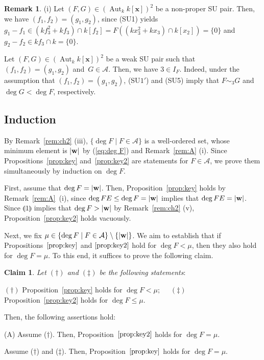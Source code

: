 \documentclass{amsart}
\theoremstyle{plain}
\theoremstyle{definition}
\newtheorem{rem}[thm]{Remark}
\newtheorem*{klaim}{Claim}
\newcommand{\A}{\mathcal{A}}
\newcommand{\zs}{\{ 0\} }
\newcommand{\sm}{\setminus}
\newcommand{\Aut }{\mathop{\mathrm{Aut}}\nolimits}
\newcommand{\nd}{\noindent}
\newcommand{\x}{{\boldsymbol x}}
\newcommand{\w}{{\bf w}}
\newcommand{\kx}{k[\x]}
\begin{document}
\begin{rem}\label{exc:used for Claim B}\rm
(i) Let $(F,G)\in (\Aut _k\kx )^2$ be a non-proper SU pair. 
Then, we have $(f_1,f_2)=(g_1,g_2)$, 
since (SU1) yields 
$g_1-f_1\in 
(kf_3^2+kf_3)\cap k[f_2]
=F((kx_3^2+kx_3)\cap k[x_2])=\zs $ 
and $g_2-f_2\in kf_3\cap k=\zs $. 



\nd{\rm (ii)} 
Let $(F,G)\in (\Aut _k\kx )^2$ be a weak SU pair 
such that $(f_1,f_2)=(g_1,g_2)$ and~$G\in \A $. 
Then, we have $3\in I_F$. 
Indeed, 
under the assumption that $(f_1,f_2)=(g_1,g_2)$, 
(SU$1'$) and (SU5) imply that $F\sim _3G$ and $\deg G<\deg F$, 
respectively. 
\end{rem}



\subsection{Induction}
By Remark~\ref{rem:ch2} (iii), 
$\{ \deg F\mid F\in \mathcal{A}\} $ 
is a well-ordered set, 
whose minimum element is $|\w |$ by 
(\ref{eq:deg F}) and Remark~\ref{rem:A} (i). 
Since Propositions~\ref{prop:key} and~\ref{prop:key2} 
are statements for $F\in \A $, 
we prove them simultaneously by induction on $\deg F$. 


First, assume that $\deg F=|\w |$. 
Then, Proposition~\ref{prop:key} holds by Remark~\ref{rem:A}~(i), 
since $\deg FE\le \deg F=|\w |$ 
implies that $\deg FE=|\w |$. 
Since $\llparenthesis 1 \rrparenthesis$ 
implies that $\deg F>|\w |$ 
by Remark~\ref{rem:ch2} (v), 
Proposition~\ref{prop:key2} holds vacuously. 


Next, we fix $\mu \in \{ \deg F\mid F\in \mathcal{A}\} \sm \{ |\w |\} $. 
We aim to establish that 
if Propositions~$\ref{prop:key}$ and $\ref{prop:key2}$ 
hold for $\deg F<\mu $, 
then they also hold for $\deg F=\mu $. 
To this end, it suffices to prove the following claim. 


\begin{klaim}\it 
Let $(\dag )$ and $(\ddag )$ be the following statements$:$ 

$(\dag )$ {\rm 
Proposition~{\rm \ref{prop:key}} 
holds for $\deg F<\mu ;$ \ \ 
$(\ddag )$ 
Proposition~{\rm \ref{prop:key2}} holds for $\deg F\le \mu $.} 

\nd Then, the following assertions hold$:$ 



\nd 
{\rm (A)} Assume {\rm ($\dag $)}. 
Then, Proposition~$\ref{prop:key2}$ 
holds for $\deg F=\mu $. 


\nd {\rm (B)} Assume {\rm ($\dag $)} and {\rm ($\ddag $)}. 
Then, Proposition~$\ref{prop:key}$ 
holds for $\deg F=\mu $. 
\end{klaim}
\end{document}
